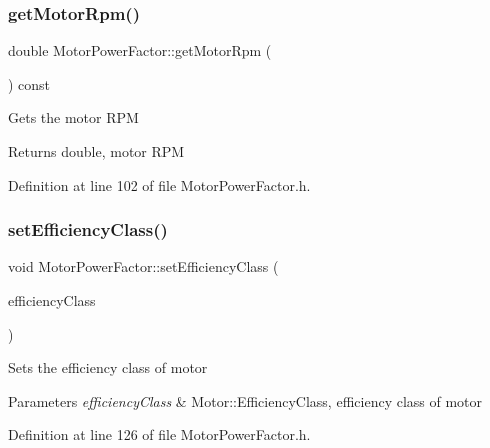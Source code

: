 \subsubsection{\texorpdfstring{get\+Motor\+Rpm()}{getMotorRpm()}}
{\footnotesize\ttfamily double Motor\+Power\+Factor\+::get\+Motor\+Rpm (\begin{DoxyParamCaption}{ }\end{DoxyParamCaption}) const\hspace{0.3cm}{\ttfamily [inline]}}

Gets the motor R\+PM \begin{DoxyReturn}{Returns}
double, motor R\+PM 
\end{DoxyReturn}


Definition at line 102 of file Motor\+Power\+Factor.\+h.

\mbox{\label{class_motor_power_factor_add3125243d7f11131abc4e1d172ffdfc}} 
\subsubsection{\texorpdfstring{set\+Efficiency\+Class()}{setEfficiencyClass()}}
{\footnotesize\ttfamily void Motor\+Power\+Factor\+::set\+Efficiency\+Class (\begin{DoxyParamCaption}\item[{Motor\+::\+Efficiency\+Class}]{efficiency\+Class }\end{DoxyParamCaption})\hspace{0.3cm}{\ttfamily [inline]}}

Sets the efficiency class of motor 
\begin{DoxyParams}{Parameters}
{\em efficiency\+Class} & Motor\+::\+Efficiency\+Class, efficiency class of motor \\
\hline
\end{DoxyParams}


Definition at line 126 of file Motor\+Power\+Factor.\+h.

\mbox{\label{class_motor_power_factor_a5186ccae4191cfc5b2b7c3bdbd166563}} 
